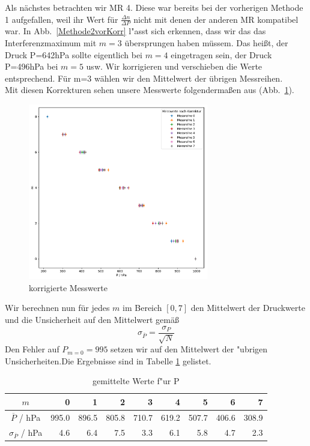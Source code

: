 \documentclass[12pt,a4paper]{article}
\begin{document}
Als nächstes betrachten wir MR 4. Diese war bereits bei der vorherigen Methode 1 aufgefallen, weil ihr Wert für $\frac{\Delta n}{\Delta P}$ nicht mit denen der anderen MR kompatibel war. In Abb.~\ref{Methode2vorKorr} l"asst sich erkennen, dass wir das das Interferenzmaximum mit $m=3$ übersprungen haben müssem. Das heißt, der Druck P=642hPa sollte eigentlich bei $m=4$ eingetragen sein, der Druck P=496hPa bei $m=5$ usw. Wir korrigieren und verschieben die Werte entsprechend. Für m=3 wählen wir den Mittelwert der übrigen Messreihen.\\
Mit diesen Korrekturen sehen unsere Messwerte folgendermaßen aus (Abb.~\ref{Methode2nachKorr}).
\begin{figure}[H]
	\centering
	\includegraphics[width=0.7\textwidth]{Python/Methode2nachKorr.pdf}
	\caption{korrigierte Messwerte}
	\label{Methode2nachKorr}
\end{figure}
Wir berechnen nun für jedes $m$ im Bereich $[0,7]$ den Mittelwert der Druckwerte und die Unsicherheit auf den Mittelwert gemäß
\begin{equation}
\sigma_{\overline{P}}=\frac{\sigma_P}{\sqrt{N}}
\end{equation}
Den Fehler auf $P_{m=0}=995$ setzen wir auf den Mittelwert der "ubrigen Unsicherheiten.Die Ergebnisse sind in Tabelle \ref{table:Methode2} gelistet.
\begin{table}[H]
	\centering
	\begin{tabular}{|c|r|r|r|r|r|r|r|r|}
		\hline
		$m$&0&1&2&3&4&5&6&7\\
		\hline
		$\overline{P}$ / hPa&995.0&896.5&805.8&710.7&619.2&507.7&406.6&308.9\\
		$\sigma_{\overline{P}}$ / hPa&4.6&6.4&7.5&3.3&6.1&5.8&4.7&2.3\\
		\hline
	\end{tabular}
	\caption{gemittelte Werte f"ur P}
	\label{table:Methode2}
\end{table}
\end{document}
